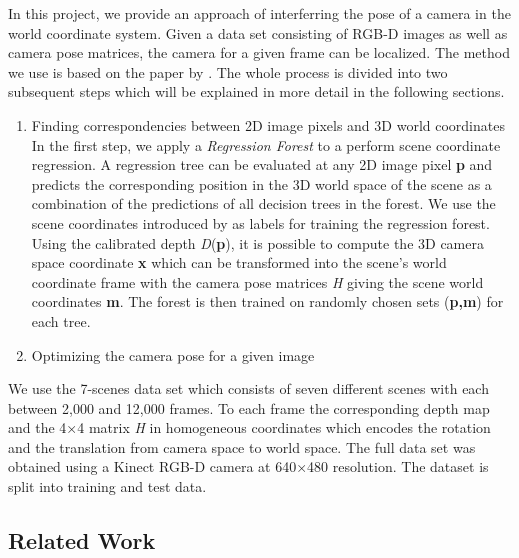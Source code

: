 \documentclass[final]{cvpr}
\begin{document}
In this project, we provide an approach of interferring the pose of a camera in the world coordinate system. Given a data set consisting of RGB-D images as well as camera pose matrices, the camera for a given frame can be localized. The method we use is based on the paper by \cite{shotton2013}.  The whole process is divided into two subsequent steps which will be explained in more detail in the following sections.
\begin{enumerate}
\item Finding correspondencies between 2D image pixels and 3D world coordinates  \\

In the first step, we apply a \textit{Regression Forest} to a perform scene coordinate regression. A regression tree can be evaluated at any 2D image pixel \textbf{p} and predicts the corresponding position in the 3D world space of the scene as a combination of the predictions of all decision trees in the forest. We use the scene coordinates introduced by \cite{shotton2013} as labels for training the regression forest. Using the calibrated depth \textit{D}(\textbf{p}), it is possible to compute the 3D camera space coordinate \textbf{x} which can be transformed into the scene's world coordinate frame with the camera pose matrices \textit{H} giving  the scene world coordinates \textbf{m}. The forest is then trained on randomly chosen sets (\textbf{p,m}) for each tree.

\item Optimizing the camera pose for a given image 
\end{enumerate}
    
    


We use the 7-scenes data set which consists of seven different scenes with each between 2,000 and 12,000 frames. To each frame the corresponding depth map and the 4×4 matrix \textit{H} in homogeneous coordinates which encodes the rotation and the translation from camera space to world space. The full data set was obtained using a Kinect RGB-D camera at 640×480 resolution. The dataset is split into training and test data.

\subsection{Related Work}
\end{document}
